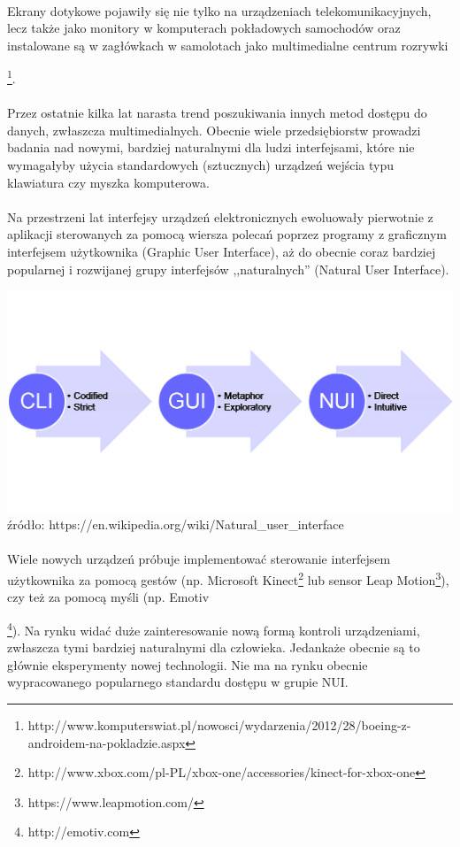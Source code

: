 \paragraph{}
Ekrany dotykowe pojawiły się nie tylko na urządzeniach telekomunikacyjnych, lecz także jako monitory w komputerach pokładowych samochodów oraz instalowane są w zagłówkach w samolotach jako multimedialne centrum rozrywki {\footnote{http://www.komputerswiat.pl/nowosci/wydarzenia/2012/28/boeing-z-androidem-na-pokladzie.aspx}.
\paragraph{}
Przez ostatnie kilka lat narasta trend poszukiwania innych metod dostępu do danych, zwłaszcza multimedialnych. Obecnie wiele przedsiębiorstw prowadzi badania nad nowymi, bardziej naturalnymi dla ludzi interfejsami, które nie wymagałyby użycia standardowych (sztucznych) urządzeń wejścia typu klawiatura czy myszka komputerowa.
\paragraph{}
Na przestrzeni lat interfejsy urządzeń elektronicznych ewoluowały pierwotnie z aplikacji sterowanych za pomocą wiersza polecań poprzez programy z graficznym interfejsem użytkownika (Graphic User Interface), aż do obecnie coraz bardziej popularnej i rozwijanej grupy interfejsów ,,naturalnych'' (Natural User Interface).
\begin{center}
\includegraphics[width=1\textwidth]{images/nui.png}
\small {źródło: https://en.wikipedia.org/wiki/Natural\_user\_interface }
\end{center}
\paragraph{}
Wiele nowych urządzeń próbuje implementować sterowanie interfejsem użytkownika za pomocą gestów (np. Microsoft Kinect\footnote{http://www.xbox.com/pl-PL/xbox-one/accessories/kinect-for-xbox-one} lub sensor Leap Motion\footnote{https://www.leapmotion.com/}), czy też za pomocą myśli (np. Emotiv{\footnote{http://emotiv.com}). Na rynku widać duże zainteresowanie nową formą kontroli urządzeniami, zwłaszcza tymi bardziej naturalnymi dla człowieka. Jedankaże obecnie są to głównie eksperymenty nowej technologii. Nie ma na rynku obecnie wypracowanego popularnego standardu dostępu w grupie NUI.

}}
